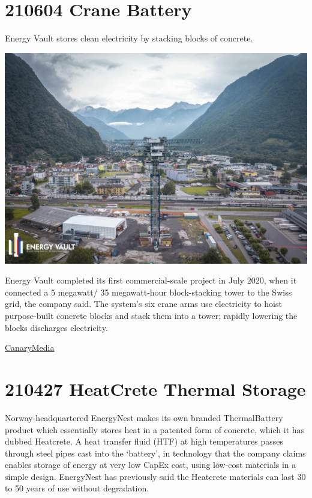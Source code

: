 \documentclass[
]{book}
\begin{document}
\hypertarget{crane-battery}{%
\section{210604 Crane Battery}\label{crane-battery}}

Energy Vault stores clean electricity by stacking blocks of concrete.

\includegraphics{fig/crane_battery.png}

Energy Vault completed its first commercial-scale project in July 2020, when it connected a 5 megawatt/ 35 megawatt-hour block-stacking tower to the Swiss grid, the company said. The system's six crane arms use electricity to hoist purpose-built concrete blocks and stack them into a tower; rapidly lowering the blocks discharges electricity.

\href{https://www.canarymedia.com/articles/energy-vault-nabs-investment-from-saudi-aramco-for-block-stacking-storage/}{CanaryMedia}

\hypertarget{heatcrete-thermal-storage}{%
\section{210427 HeatCrete Thermal Storage}\label{heatcrete-thermal-storage}}

Norway-headquartered EnergyNest makes its own branded ThermalBattery product which essentially stores heat in a patented form of concrete, which it has dubbed Heatcrete. A heat transfer fluid (HTF) at high temperatures passes through steel pipes cast into the `battery', in technology that the company claims enables storage of energy at very low CapEx cost, using low-cost materials in a simple design. EnergyNest has previously said the Heatcrete materials can last 30 to 50 years of use without degradation.
\end{document}
